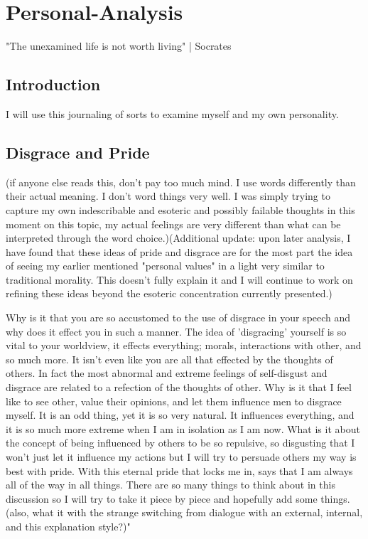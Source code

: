 
\chapter{Personal-Analysis}
"The unexamined life is not worth living" | Socrates
\section{Introduction}
I will use this journaling of sorts to examine myself and my own personality.
\section{Disgrace and Pride}
(if anyone else reads this, don't pay too much mind. I use words differently than their actual meaning. I don't word things very well. I was simply trying to capture my own indescribable and esoteric and possibly failable thoughts in this moment on this topic, my actual feelings are very different than what can be interpreted through the word choice.)(Additional update: upon later analysis, I have found that these ideas of pride and disgrace are for the most part the idea of seeing my earlier mentioned "personal values" in a light very similar to traditional morality. This doesn't fully explain it and I will continue to work on refining these ideas beyond the esoteric concentration currently presented.)
\par Why is it that you are so accustomed to the use of disgrace in your speech and why does it effect you in such a manner. The idea of 'disgracing' yourself is so vital to your worldview, it effects everything; morals, interactions with other, and so much more. It isn't even like you are all that effected by the thoughts of others. In fact the most abnormal and extreme feelings of self-disgust and disgrace are related to a refection of the thoughts of other. Why is it that I feel like to see other, value their opinions, and let them influence men to disgrace myself. It is an odd thing, yet it is so very natural. It influences everything, and it is so much more extreme when I am in isolation as I am now. What is it about the concept of being influenced by others to be so repulsive, so disgusting that I won't just let it influence my actions but I will try to persuade others my way is best with pride. With this eternal pride that locks me in, says that I am always all of the way in all things. There are so many things to think about in this discussion so I will try to take it piece by piece and hopefully add some things.(also, what it with the strange switching from dialogue with an external, internal, and this explanation style?)"
